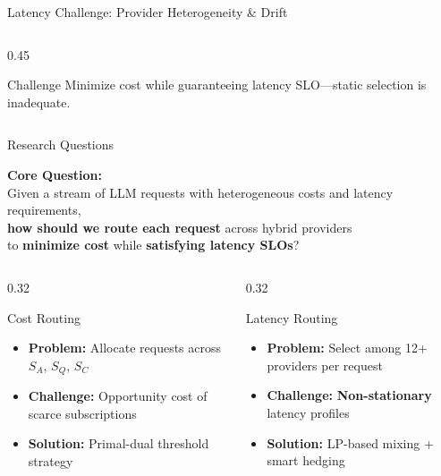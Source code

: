 \documentclass[aspectratio=169,10pt]{beamer}
\begin{document}
\begin{frame}{Latency Challenge: Provider Heterogeneity \& Drift}
\begin{columns}[T]
\begin{column}{0.45\textwidth}
    \vspace{0.15cm}
    \begin{alertblock}{Challenge}
    \small
    Minimize cost while guaranteeing latency SLO---static selection is inadequate.
    \end{alertblock}
\end{column}
\end{columns}
\end{frame}

\begin{frame}{Research Questions}
\begin{center}
\Large
\textcolor{icmlblue}{\textbf{Core Question:}}\\[0.3cm]
\normalsize
Given a stream of LLM requests with heterogeneous costs and latency requirements,\\
\textbf{how should we route each request} across hybrid providers\\
to \textbf{minimize cost} while \textbf{satisfying latency SLOs}?
\end{center}

\vspace{0.3cm}

\begin{columns}[T]
\begin{column}{0.32\textwidth}
\begin{alertblock}{Cost Routing}
\begin{itemize}\setlength{\itemsep}{1pt}
    \item \textbf{Problem:} Allocate requests across $S_A$, $S_Q$, $S_C$
    \item \textbf{Challenge:} \alert{Opportunity cost} of scarce subscriptions
    \item \textbf{Solution:} Primal-dual threshold strategy
\end{itemize}
\end{alertblock}
\end{column}

\begin{column}{0.32\textwidth}
\begin{block}{Latency Routing}
\begin{itemize}\setlength{\itemsep}{1pt}
    \item \textbf{Problem:} Select among 12+ providers per request
    \item \textbf{Challenge:} \textbf{Non-stationary} latency profiles
    \item \textbf{Solution:} LP-based mixing + smart hedging
\end{itemize}
\end{block}
\end{column}


\end{columns}
\end{frame}
\end{document}
